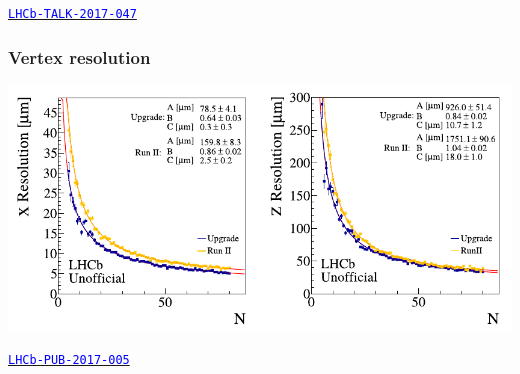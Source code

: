 \documentclass[table,xcolor=dvipsnames,professionalfonts]{beamer}
\newcommand{\myhref}[2]{\href{#1}{\footnotesize{\textcolor{blue}{\texttt{#2}}}}}
\begin{document}
\begin{frame}
\begin{columns}
\begin{column}{.7\textwidth}
  \end{column}\end{columns}
  \myhref{https://cds.cern.ch/record/2255840}{LHCb-TALK-2017-047}
\end{frame}

\begin{frame}
  \frametitle{Vertex resolution}
  \includegraphics[width=\textwidth]{./vertexresolution.pdf}

      \myhref{https://cds.cern.ch/record/2244312}{LHCb-PUB-2017-005}
\end{frame}
\end{document}
